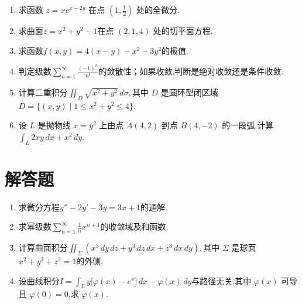 \begin{enumerate}
	\item 求函数 $z=xe^{x-2y}$ 在点 $(1,\frac12)$ 处的全微分.
	
	\item 求曲面$z=x^2+y^2-1$在点 $(2,1,4)$ 处的切平面方程.
	
	\item 求函数$f(x,y)=4(x-y)-x^2-3y^2$的极值.
	
	\item 判定级数$\sum_{n=1}^{\infty}\frac{(-1)^n}{n!}$的敛散性；如果收敛,判断是绝对收敛还是条件收敛.
	
	\item 计算二重积分$\iint_D \sqrt{x^2+y^2}\,d\sigma,$其中 $D$ 是圆环型闭区域$D=\{(x,y)\mid 1\le x^2+y^2\le 4\}.$
	
	\item 设 $L$ 是抛物线 $x=y^2$ 上由点 $A(4,2)$ 到点 $B(4,-2)$ 的一段弧,计算$\int_L 2xy\,dx+x^2\,dy.$
\end{enumerate}

\section{解答题}

\begin{enumerate}

\item 求微分方程$y''-2y'-3y=3x+1$的通解.


\item 求幂级数$\sum_{n=1}^{\infty}\frac{1}{n}x^{n+1}$的收敛域及和函数.


\item 计算曲面积分$\iint_{\Sigma}\left(x^3\,dy\,dz+y^3\,dz\,dx+z^3\,dx\,dy\right),$其中 $\Sigma$ 是球面$x^2+y^2+z^2=1$的外侧.


\item 设曲线积分$I=\int_L y\big[ \varphi(x)-e^x \big] \,dx-\varphi(x)\,dy$与路径无关,其中 $\varphi(x)$ 可导且 $\varphi(0)=0$,求 $\varphi(x)$.

\end{enumerate}

\newpage